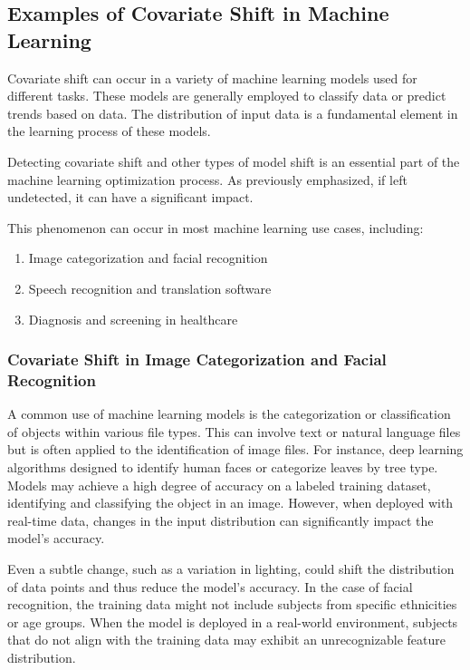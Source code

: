 \subsection{Examples of Covariate Shift in Machine Learning}

Covariate shift can occur in a variety of machine learning models used for different tasks. These models are generally employed to classify data or predict trends based on data. The distribution of input data is a fundamental element in the learning process of these models.

Detecting covariate shift and other types of model shift is an essential part of the machine learning optimization process. As previously emphasized, if left undetected, it can have a significant impact.

This phenomenon can occur in most machine learning use cases, including:

\begin{enumerate}
    \item Image categorization and facial recognition
    \item Speech recognition and translation software
    \item Diagnosis and screening in healthcare
\end{enumerate}


\subsubsection{Covariate Shift in Image Categorization and Facial Recognition}
A common use of machine learning models is the categorization or classification of objects within various file types. This can involve text or natural language files but is often applied to the identification of image files. For instance, deep learning algorithms designed to identify human faces or categorize leaves by tree type. Models may achieve a high degree of accuracy on a labeled training dataset, identifying and classifying the object in an image. However, when deployed with real-time data, changes in the input distribution can significantly impact the model's accuracy.

Even a subtle change, such as a variation in lighting, could shift the distribution of data points and thus reduce the model's accuracy. In the case of facial recognition, the training data might not include subjects from specific ethnicities or age groups. When the model is deployed in a real-world environment, subjects that do not align with the training data may exhibit an unrecognizable feature distribution.

